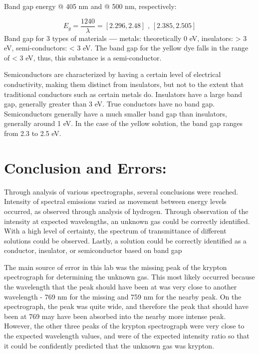 \documentclass[10pt, letterpaper, twoside]{article}
\begin{document}
Band gap energy @ 405 nm and @ 500 nm, respectively:
\vspace{-1em}

\begin{equation*}
    E_g = \frac{1240}{\lambda} = [2.296, 2.48]\text{ , }[2.385, 2.505]
\end{equation*}
Band gap for 3 types of materials \textbf{---} metals: theoretically 0 eV, insulators: > 3 eV, semi-conductors: < 3 eV. The band gap for the yellow dye falls in the range of < 3 eV, thus, this substance is a semi-conductor.

Semiconductors are characterized by having a certain level of electrical conductivity, making them distinct from insulators, but not to the extent that traditional conductors such as certain metals do. Insulators have a large band gap, generally greater than 3 eV. True conductors have no band gap. Semiconductors generally have a much smaller band gap than insulators, generally around 1 eV. In the case of the yellow solution, the band gap ranges from 2.3 to 2.5 eV. 

\section{Conclusion and Errors:}

Through analysis of various spectrographs, several conclusions were reached. Intensity of spectral emissions varied as movement between energy levels occurred, as observed through analysis of hydrogen. Through observation of the intensity at expected wavelengths, an unknown gas could be correctly identified. With a high level of certainty, the spectrum of transmittance of different solutions could be observed. Lastly, a solution could be correctly identified as a conductor, insulator, or semiconductor based on band gap



The main source of error in this lab was the missing peak of the krypton spectrograph for determining the unknown gas. This most likely occurred because the wavelength that the peak should have been at was very close to another wavelength - 769 nm for the missing and 759 nm for the nearby peak. On the spectrograph, the peak was quite wide, and therefore the peak that should have been at 769 may have been absorbed into the nearby more intense peak. However, the other three peaks of the krypton spectrograph were very close to the expected wavelength values, and were of the expected intensity ratio so that it could be confidently predicted that the unknown gas was krypton.
\end{document}
